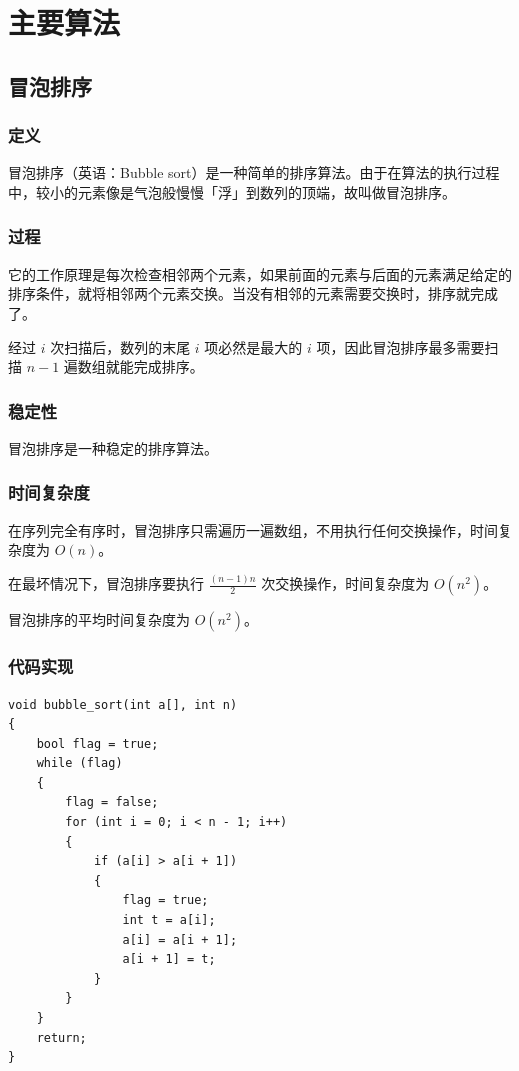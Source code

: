 \documentclass[12pt]{article}
\begin{document}
\newpage

\section{主要算法}

\subsection{冒泡排序}

\subsubsection{定义}

冒泡排序（英语：Bubble sort）是一种简单的排序算法。由于在算法的执行过程中，较小的元素像是气泡般慢慢「浮」到数列的顶端，故叫做冒泡排序。

\subsubsection{过程}

它的工作原理是每次检查相邻两个元素，如果前面的元素与后面的元素满足给定的排序条件，就将相邻两个元素交换。当没有相邻的元素需要交换时，排序就完成了。

经过 $i$ 次扫描后，数列的末尾 $i$ 项必然是最大的 $i$ 项，因此冒泡排序最多需要扫描 $n-1$ 遍数组就能完成排序。

\subsubsection{稳定性}

冒泡排序是一种稳定的排序算法。

\subsubsection{时间复杂度}

在序列完全有序时，冒泡排序只需遍历一遍数组，不用执行任何交换操作，时间复杂度为 $O(n)$。

在最坏情况下，冒泡排序要执行 $\frac{(n-1)n}{2}$ 次交换操作，时间复杂度为 $O(n^2)$。

冒泡排序的平均时间复杂度为 $O(n^2)$。

\subsubsection{代码实现}

{\setmainfont{Consolas} %
\begin{lstlisting}
void bubble_sort(int a[], int n)
{
    bool flag = true;
    while (flag)
    {
        flag = false;
        for (int i = 0; i < n - 1; i++)
        {
            if (a[i] > a[i + 1])
            {
                flag = true;
                int t = a[i];
                a[i] = a[i + 1];
                a[i + 1] = t;
            }
        }
    }
    return;
}
\end{lstlisting}
}
\end{document}
